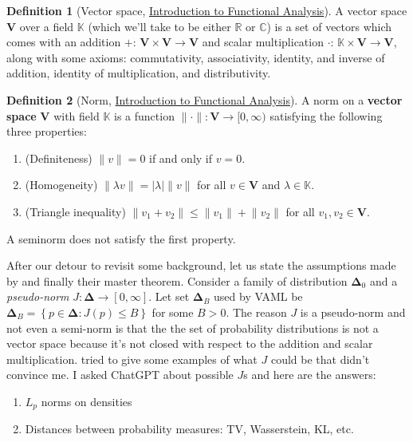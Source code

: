 \documentclass[a4paper]{article}
\theoremstyle{definition}
\newtheorem{definition}{Definition}
\theoremstyle{remark}
\theoremstyle{plain}
\newcommand{\bV}{\mathbf{V}}
\newcommand{\bDelta}{\mathbf{\Delta}}
\newcommand{\C}{\mathbb{C}}
\newcommand{\R}{\mathbb{R}}
\newcommand{\K}{\mathbb{K}}
\begin{document}
%
\begin{definition}[Vector space, \href{https://ocw.mit.edu/courses/18-102-introduction-to-functional-analysis-spring-2021/8fb8d5c170f1613151aca71de21027bc_MIT18_102s21_full_lec.pdf}{Introduction to Functional Analysis}]
    A vector space $\bV$ over a field $\K$ (which we’ll take to be either $\R$ or $\C$) is a set of vectors which comes with an addition $+$: $\bV \times \bV \to \bV$ and scalar multiplication $\cdot$: $\K \times \bV \to \bV$, along with some axioms: commutativity, associativity, identity, and inverse of addition, identity of multiplication, and distributivity.
\end{definition}
%
\begin{definition}[Norm, \href{https://ocw.mit.edu/courses/18-102-introduction-to-functional-analysis-spring-2021/8fb8d5c170f1613151aca71de21027bc_MIT18_102s21_full_lec.pdf}{Introduction to Functional Analysis}]
    A norm on a \textbf{vector space} $\bV$ with field $\K$ is a function $\lVert \cdot \rVert: \bV \to [0, \infty)$ satisfying the following three properties:
    \begin{enumerate}[label=(\alph*)]
        \item (Definiteness) $\lVert v \rVert = 0$ if and only if $v = 0$.
        \item (Homogeneity) $\lVert \lambda v \rVert = |\lambda|\lVert v \rVert$ for all $v \in \bV$ and $\lambda \in \K$.
        \item (Triangle inequality) $\lVert v_1 + v_2\rVert \leq \lVert v_1\rVert + \lVert v_2\rVert$ for all $v_1, v_2 \in \bV$.
    \end{enumerate}
    A seminorm does not satisfy the first property.
\end{definition}
%
After our detour to revisit some background, let us state the assumptions made by \citet{farahmand2017value} and finally their master theorem. Consider a family of distribution $\bDelta_0$ and a \emph{pseudo-norm} $J: \bDelta \to [0, \infty]$. Let set $\bDelta_B$ used by VAML be $\bDelta_B = \left\{p \in \bDelta: J(p) \leq B \right\}$ for some $B > 0$. The reason $J$ is a pseudo-norm and not even a semi-norm is that the the set of probability distributions is not a vector space because it's not closed with respect to the addition and scalar multiplication. \citet{farahmand2017value} tried to give some examples of what $J$ could be that didn't convince me. I asked ChatGPT about possible $J$s and here are the answers:
\begin{enumerate}[label=(\Alph*)]
    \item $L_p$ norms on densities
    \item Distances between probability measures: TV, Wasserstein, KL, etc.
\end{enumerate}
\end{document}
